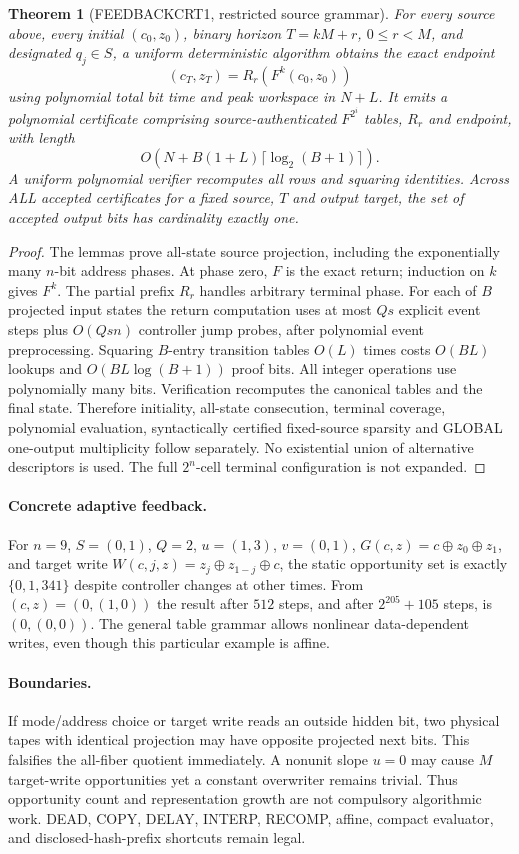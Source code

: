 \documentclass[11pt]{article}
\newtheorem{theorem}{Theorem}
\begin{document}
\begin{theorem}[FEEDBACKCRT1, restricted source grammar]
For every source above, every initial $(c_0,z_0)$, binary horizon $T=kM+r$, $0\le r<M$, and designated $q_j\in S$, a uniform deterministic algorithm obtains the exact endpoint
\[
(c_T,z_T)=R_r(F^k(c_0,z_0))
\]
using polynomial total bit time and peak workspace in $N+L$. It emits a polynomial certificate comprising source-authenticated $F^{2^i}$ tables, $R_r$ and endpoint, with length
\[
O\left(N+B(1+L)\lceil\log_2(B+1)\rceil\right).
\]
A uniform polynomial verifier recomputes all rows and squaring identities. Across ALL accepted certificates for a fixed source, $T$ and output target, the set of accepted output bits has cardinality exactly one.
\end{theorem}
\begin{proof}
The lemmas prove all-state source projection, including the exponentially many $n$-bit address phases. At phase zero, $F$ is the exact return; induction on $k$ gives $F^k$. The partial prefix $R_r$ handles arbitrary terminal phase. For each of $B$ projected input states the return computation uses at most $Qs$ explicit event steps plus $O(Qsn)$ controller jump probes, after polynomial event preprocessing. Squaring $B$-entry transition tables $O(L)$ times costs $O(BL)$ lookups and $O(BL\log(B+1))$ proof bits. All integer operations use polynomially many bits. Verification recomputes the canonical tables and the final state. Therefore initiality, all-state consecution, terminal coverage, polynomial evaluation, syntactically certified fixed-source sparsity and GLOBAL one-output multiplicity follow separately. No existential union of alternative descriptors is used. The full $2^n$-cell terminal configuration is not expanded.
\end{proof}
\paragraph{Concrete adaptive feedback.}
For $n=9$, $S=(0,1)$, $Q=2$, $u=(1,3)$, $v=(0,1)$, $G(c,z)=c\oplus z_0\oplus z_1$, and target write $W(c,j,z)=z_j\oplus z_{1-j}\oplus c$, the static opportunity set is exactly $\{0,1,341\}$ despite controller changes at other times. From $(c,z)=(0,(1,0))$ the result after $512$ steps, and after $2^{205}+105$ steps, is $(0,(0,0))$. The general table grammar allows nonlinear data-dependent writes, even though this particular example is affine.
\paragraph{Boundaries.}
If mode/address choice or target write reads an outside hidden bit, two physical tapes with identical projection may have opposite projected next bits. This falsifies the all-fiber quotient immediately. A nonunit slope $u=0$ may cause $M$ target-write opportunities yet a constant overwriter remains trivial. Thus opportunity count and representation growth are not compulsory algorithmic work. DEAD, COPY, DELAY, INTERP, RECOMP, affine, compact evaluator, and disclosed-hash-prefix shortcuts remain legal.
\end{document}
